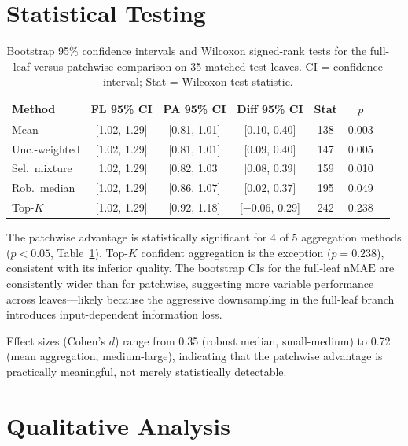 \documentclass[11pt,a4paper]{article}
\newcommand{\nMAE}{\mathrm{nMAE}}
\begin{document}
\section{Statistical Testing}
\label{sec:stats}

\begin{table}[h]
\centering
\caption{Bootstrap 95\% confidence intervals and Wilcoxon signed-rank tests for the full-leaf versus patchwise comparison on 35 matched test leaves. CI = confidence interval; Stat = Wilcoxon test statistic.}
\label{tab:stats}
\begin{tabular}{lcccccc}
\toprule
Method & FL 95\% CI & PA 95\% CI & Diff 95\% CI & Stat & $p$ \\
\midrule
Mean           & [1.02, 1.29] & [0.81, 1.01] & [0.10, 0.40] & 138 & 0.003 \\
Unc.-weighted  & [1.02, 1.29] & [0.81, 1.01] & [0.09, 0.40] & 147 & 0.005 \\
Sel.\ mixture  & [1.02, 1.29] & [0.82, 1.03] & [0.08, 0.39] & 159 & 0.010 \\
Rob.\ median   & [1.02, 1.29] & [0.86, 1.07] & [0.02, 0.37] & 195 & 0.049 \\
Top-$K$        & [1.02, 1.29] & [0.92, 1.18] & [$-$0.06, 0.29] & 242 & 0.238 \\
\bottomrule
\end{tabular}
\end{table}

The patchwise advantage is statistically significant for 4 of 5 aggregation methods ($p < 0.05$, Table~\ref{tab:stats}).
Top-$K$ confident aggregation is the exception ($p = 0.238$), consistent with its inferior quality.
The bootstrap CIs for the full-leaf $\nMAE$ are consistently wider than for patchwise, suggesting more variable performance across leaves---likely because the aggressive downsampling in the full-leaf branch introduces input-dependent information loss.

Effect sizes (Cohen's $d$) range from 0.35 (robust median, small-medium) to 0.72 (mean aggregation, medium-large), indicating that the patchwise advantage is practically meaningful, not merely statistically detectable.


\section{Qualitative Analysis}
\label{sec:qualitative}
\end{document}
